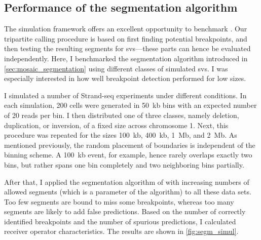 \subsection{Performance of the segmentation algorithm}
\label{sec:mosaic_segm_simul}

The simulation framework offers an excellent opportunity to benchmark \mc. Our
tripartite calling procedure is based on first finding potential breakpoints,
and then testing the resulting segments for \acp{sv}---these parts can hence be
evaluated independently. Here, I benchmarked the segmentation algorithm
introduced in \cref{sec:mosaic_segmentation} using different classes of
simulated \acp{sv}. I was especially interested in how well breakpoint detection
performed for low \sv sizes.

I simulated a number of Strand-seq experiments under different conditions. In
each simulation, 200 cells were generated in 50~kb bins with an expected number
of 20 reads per bin. I then distributed one of three \sv classes, namely
deletion, duplication, or inversion, of a fixed size across chromosome 1. Next, this procedure
was repeated for the \sv sizes 100~kb, 400~kb, 1~Mb, and 2~Mb. As mentioned
previously, the random placement of \sv boundaries is independent of the binning
scheme. A 100~kb event, for example, hence rarely overlaps exactly two bins, but
rather spans one bin completely and two neighboring bins partially.

After that, I applied the segmentation algorithm of \mc with
increasing numbers of allowed segments (which is a parameter
of the algorithm) to all these data sets. Too few segments
are bound to miss some \sv breakpoints, whereas too many segments are likely to add false
predictions. Based on the number of correctly identified breakpoints and the
number of spurious predictions, I calculated receiver operator characteristics.
The results are shown in \cref{fig:segm_simul}.


